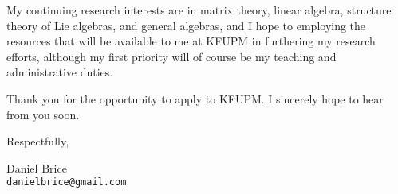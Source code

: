 \documentclass[11pt]{article}
\begin{document}
My continuing research interests are in matrix theory, linear algebra,
structure theory of Lie algebras, and general algebras, and I hope to
employing the resources that will be available to me at
KFUPM in furthering my research efforts, although my first priority
will of course be my teaching and administrative duties.

Thank you for the opportunity to apply to KFUPM. I sincerely hope to
hear from you soon.

\vfill

Respectfully,

\vfill

Daniel Brice\\
\texttt{danielbrice@gmail.com}

\label{page:last}
\end{document}
